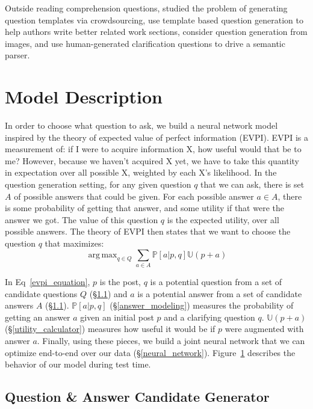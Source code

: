 \documentclass[11pt,a4paper]{article}
\DeclareMathOperator*{\argmax}{arg\,max}
\newcommand{\U}{\mathbb{U}}
\begin{document}
Outside reading comprehension questions,  studied the problem of generating question templates via crowdsourcing,  use template based question generation to help authors write better related work sections,  consider question generation from images, and   use human-generated clarification questions to drive a semantic parser.

\section{Model Description}\label{model}

In order to choose what question to ask, we build a neural network model inspired by the theory of expected value of perfect information (EVPI). EVPI is a measurement of: if I were to acquire information X, how useful would that be to me? However, because we haven't acquired X yet, we have to take this quantity in expectation over all possible X, weighted by each X's likelihood. In the question generation setting, for any given question $q$ that we can ask, there is set $A$ of possible answers that could be given. For each possible answer $a \in A$, there is some probability of getting that answer, and some utility if that were the answer we got. The value of this question $q$ is the expected utility, over all possible answers. The theory of EVPI then states that we want to choose the question $q$ that maximizes:
\begin{equation}\label{evpi_equation}
\argmax_{q \in Q} \sum_{a \in A} \mathbb{P}[a | p,q] \U(p+a)
\end{equation} 

In Eq~\ref{evpi_equation}, $p$ is the post, $q$ is a potential question from a set of candidate questions $Q$ (\S\ref{question_candidate_generator}) and $a$ is a potential answer from a set of candidate answers $A$ (\S\ref{question_candidate_generator}). $\mathbb{P}[a | p,q]$ (\S\ref{answer_modeling}) measures the probability of getting an answer $a$ given an initial post $p$ and a clarifying question $q$. $\U(p+a)$ (\S\ref{utility_calculator}) measures how useful it would be if $p$ were augmented with answer $a$. Finally, using these pieces, we build a joint neural network that we can optimize end-to-end over our data (\S\ref{neural_network}). Figure~\ref{model} describes the behavior of our model during test time. 

\subsection{Question \& Answer Candidate Generator}\label{question_candidate_generator}
\end{document}
